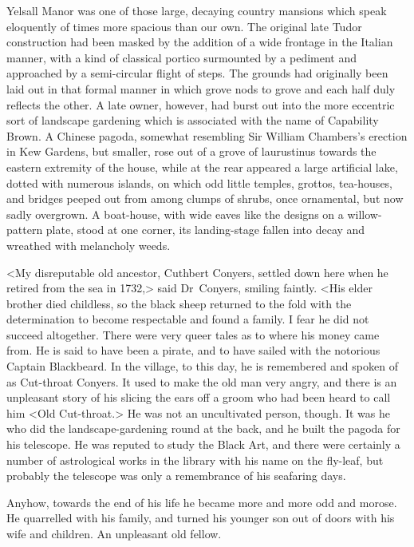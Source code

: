 \divider
Yelsall Manor was one of those large, decaying country mansions which speak eloquently of times more spacious than our own. The original late Tudor construction had been masked by the addition of a wide frontage in the Italian manner, with a kind of classical portico surmounted by a pediment and approached by a semi-circular flight of steps. The grounds had originally been laid out in that formal manner in which grove nods to grove and each half duly reflects the other. A late owner, however, had burst out into the more eccentric sort of landscape gardening which is associated with the name of Capability Brown. A Chinese pagoda, somewhat resembling Sir William Chambers's erection in Kew Gardens, but smaller, rose out of a grove of laurustinus towards the eastern extremity of the house, while at the rear appeared a large artificial lake, dotted with numerous islands, on which odd little temples, grottos, tea-houses, and bridges peeped out from among clumps of shrubs, once ornamental, but now sadly overgrown. A boat-house, with wide eaves like the designs on a willow-pattern plate, stood at one corner, its landing-stage fallen into decay and wreathed with melancholy weeds.

<My disreputable old ancestor, Cuthbert Conyers, settled down here when he retired from the sea in 1732,> said Dr~Conyers, smiling faintly. <His elder brother died childless, so the black sheep returned to the fold with the determination to become respectable and found a family. I fear he did not succeed altogether. There were very queer tales as to where his money came from. He is said to have been a pirate, and to have sailed with the notorious Captain Blackbeard. In the village, to this day, he is remembered and spoken of as Cut-throat Conyers. It used to make the old man very angry, and there is an unpleasant story of his slicing the ears off a groom who had been heard to call him <Old Cut-throat.> He was not an uncultivated person, though. It was he who did the landscape-gardening round at the back, and he built the pagoda for his telescope. He was reputed to study the Black Art, and there were certainly a number of astrological works in the library with his name on the fly-leaf, but probably the telescope was only a remembrance of his seafaring days.

Anyhow, towards the end of his life he became more and more odd and morose. He quarrelled with his family, and turned his younger son out of doors with his wife and children. An unpleasant old fellow.

